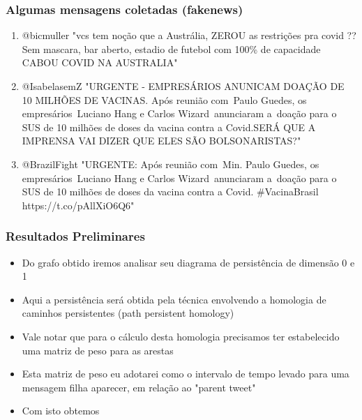 \documentclass[11pt]{beamer}
\theoremstyle{remark}
\theoremstyle{definition}
\theoremstyle{plain}
\begin{document}
	\begin{frame}
		\frametitle{Algumas mensagens coletadas (fakenews)}
		\begin{enumerate}

			\item
                @bicmuller "vcs tem noção que a Austrália, ZEROU as
                restrições pra covid ?? Sem mascara, bar aberto, estadio
                de futebol com 100\% de capacidade CABOU COVID NA
                AUSTRALIA"

			\item
                @IsabelasemZ "URGENTE - EMPRESÁRIOS ANUNICAM DOAÇÃO DE
                10 MILHÕES DE VACINAS. Após reunião com Paulo Guedes,
                os empresários Luciano Hang e Carlos Wizard anunciaram
                a doação para o SUS de 10 milhões de doses da vacina
                contra a Covid.SERÁ QUE A IMPRENSA VAI DIZER QUE ELES
                SÃO BOLSONARISTAS?"

			\item
                @BrazilFight "URGENTE: Após reunião com Min. Paulo
                Guedes, os empresários Luciano Hang e Carlos
                Wizard anunciaram a doação para o SUS de 10 milhões
                de doses da vacina contra a Covid. \#VacinaBrasil
                https://t.co/pAllXiO6Q6"
		\end{enumerate}
		\end{frame}

	\begin{frame}
		\frametitle{Resultados Preliminares}
		\begin{itemize}
			\item Do grafo obtido iremos analisar seu diagrama
				de persistência de dimensão 0 e 1

			\item Aqui a persistência será obtida pela técnica
				envolvendo a homologia de caminhos persistentes (path persistent
				homology)
			\item Vale notar que para o cálculo desta homologia precisamos
				ter estabelecido uma matriz de peso para as arestas
			\item Esta matriz de peso eu adotarei como o intervalo de tempo levado
				para uma mensagem filha aparecer, em relação ao "parent tweet"
			\item Com isto obtemos
		\end{itemize}
		\end{frame}
\end{document}
